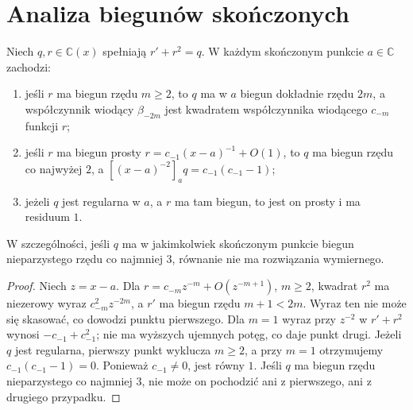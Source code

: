 \section{Analiza biegunów skończonych}

\begin{lemat}
\label{aa:lem:kov-rational-local-orders}
Niech $q,r\in\mathbb C(x)$
spełniają $r'+r^2=q$.
W każdym skończonym punkcie
$a\in\mathbb C$ zachodzi:
\begin{enumerate}
\item jeśli $r$ ma biegun rzędu
$m\ge2$, to $q$ ma w $a$
biegun dokładnie rzędu $2m$,
a współczynnik wiodący
$\beta_{-2m}$ jest kwadratem
współczynnika wiodącego
$c_{-m}$ funkcji $r$;
\item jeśli $r$ ma biegun prosty
$r=c_{-1}(x-a)^{-1}+O(1)$,
to $q$ ma biegun rzędu co
najwyżej $2$, a
$[ (x-a)^{-2}]_a q
=c_{-1}(c_{-1}-1)$;
\item jeżeli $q$ jest regularna w $a$,
a $r$ ma tam biegun,
to jest on prosty i ma residuum $1$.
\end{enumerate}
W szczególności, jeśli $q$ ma
w jakimkolwiek skończonym
punkcie biegun nieparzystego
rzędu co najmniej $3$,
równanie nie ma rozwiązania wymiernego.
\end{lemat}
\begin{proof}
Niech $z=x-a$.
Dla $r=c_{-m}z^{-m}+O(z^{-m+1})$,
$m\ge2$, kwadrat $r^2$
ma niezerowy wyraz
$c_{-m}^2z^{-2m}$,
a $r'$ ma biegun rzędu
$m+1<2m$. Wyraz ten
nie może się skasować,
co dowodzi punktu pierwszego.
Dla $m=1$ wyraz przy
$z^{-2}$ w $r'+r^2$
wynosi $-c_{-1}+c_{-1}^2$;
nie ma wyższych ujemnych potęg,
co daje punkt drugi.
Jeżeli $q$ jest regularna,
pierwszy punkt wyklucza
$m\ge2$, a przy $m=1$
otrzymujemy
$c_{-1}(c_{-1}-1)=0$.
Ponieważ $c_{-1}\ne0$,
jest równy $1$.
Jeśli $q$ ma biegun rzędu
nieparzystego co najmniej $3$,
nie może on pochodzić
ani z pierwszego, ani
z drugiego przypadku.
\end{proof}

